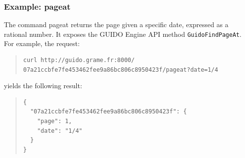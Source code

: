 \documentclass{article}
\newcommand{\guidosize}{6pt}
\begin{document}
\subsubsection{Example: pageat}
The command pageat returns the page given a specific date, expressed as a rational number.  It exposes the GUIDO Engine API method \verb=GuidoFindPageAt=.  For example, the request:
\begin{quote}
\begingroup
\fontsize{\guidosize}{12pt}\selectfont
\begin{verbatim}
curl http://guido.grame.fr:8000/
07a21ccbfe7fe453462fee9a86bc806c8950423f/pageat?date=1/4
\end{verbatim}
\endgroup
\end{quote}
yields the following result:
\begin{quote}
\begingroup
\fontsize{\guidosize}{12pt}\selectfont
\begin{verbatim}
{
  "07a21ccbfe7fe453462fee9a86bc806c8950423f": {
    "page": 1,
    "date": "1/4"
  }
}
\end{verbatim}
\endgroup
\end{quote}
\end{document}
